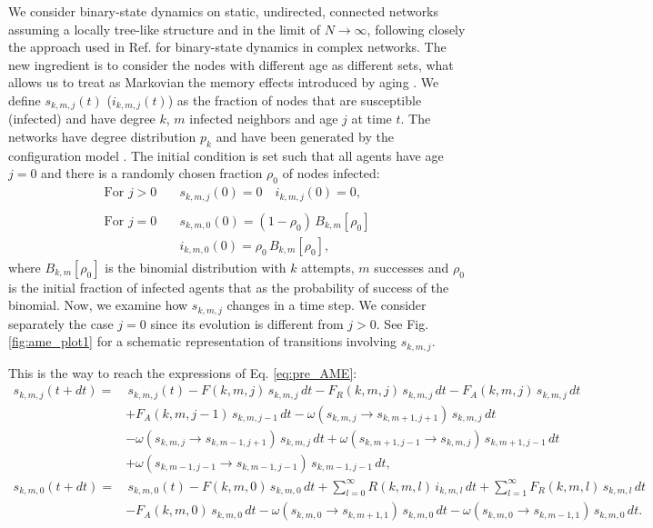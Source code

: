 We consider  binary-state dynamics on static, undirected, connected networks assuming a locally tree-like structure and in the limit of $N \to \infty$, following closely the approach used in Ref. \cite{gleeson-2013} for binary-state dynamics in complex networks. The new ingredient  is to consider the nodes with different age as different sets, what allows us to treat as Markovian the memory effects introduced by aging \cite{peralta-2020C,peralta-2020A}. We define $s_{k,m,j} (t)$ ($i_{k,m,j} (t)$) as the fraction of nodes that are susceptible (infected) and have degree $k$, $m$ infected neighbors and age $j$ at time $t$. The networks have degree distribution $p_k$ and have been generated by the configuration model \cite{molloy-1995,newman-2001}. The initial condition is set such that all agents have age $j = 0$ and there is a randomly chosen fraction $\rho_0$ of nodes infected:
\begin{align} \label{initial_condition} 
    \textrm{For } j > 0 & \quad    s_{k,m,j} (0) = 0  \quad   i_{k,m,j} (0) = 0, \nonumber\\
    \\
    \textrm{For } j = 0 & \quad    s_{k,m,0} (0) = (1 -  \rho_0)\, B_{k,m}[\rho_0] \nonumber \\
                        & \quad    i_{k,m,0} (0) = \rho_0\, B_{k,m}[\rho_0], \nonumber
\end{align}
where $B_{k,m}[\rho_0]$ is the binomial distribution with $k$ attempts, $m$ successes and $\rho_0$ is the initial fraction of infected agents that as the probability of success of the binomial. Now, we examine how $s_{k,m,j}$ changes in a time step. We consider separately the case $j = 0$ since its evolution is different from $j > 0$. See Fig. \ref{fig:ame_plot1} for a schematic representation of transitions involving $s_{k,m,j}$.
    
This is the way to reach the expressions of Eq. \eqref{eq:pre_AME}:
\begin{align} \label{eq:pre_AME}
        s_{k,m,j} (t + dt) = & \, s_{k,m,j}(t) - F (k,m,j)\, s_{k,m,j}\, dt - F_{R} (k,m,j)\, s_{k,m,j} \, dt - F_{A} (k,m,j) \, s_{k,m,j} \, dt \nonumber \\
        & + F_{A} (k,m,j-1)\,  s_{k,m,j-1} \, dt - \omega (s_{k,m,j} \to s_{k,m+1,j+1}) \, s_{k,m,j}\, dt  \nonumber \\
        & - \omega (s_{k,m,j} \to s_{k,m-1,j+1})\,  s_{k,m,j} \, dt + \omega (s_{k,m+1,j-1} \to s_{k,m,j}) \, s_{k,m+1,j-1} \, dt \nonumber \\
        & + \omega (s_{k,m-1,j-1} \to s_{k,m-1,j-1}) \, s_{k,m-1,j-1}\,  dt, \\
        s_{k,m,0} (t + dt) = &\,  s_{k,m,0}(t) - F (k,m,0) \, s_{k,m,0} \, dt + \sum_{l = 0}^{\infty} R (k,m,l)\,  i_{k,m,l} \, dt + \sum_{l = 1}^{\infty} F_{R} (k,m,l)\,  s_{k,m,l}\,  dt   \nonumber\\
        & - F_{A} (k,m,0)\,  s_{k,m,0}\,  dt - \omega (s_{k,m,0} \to s_{k,m+1,1}) \, s_{k,m,0}\,  dt - \omega (s_{k,m,0} \to s_{k,m-1,1})\,  s_{k,m,0} \, dt .\nonumber
\end{align}
    
